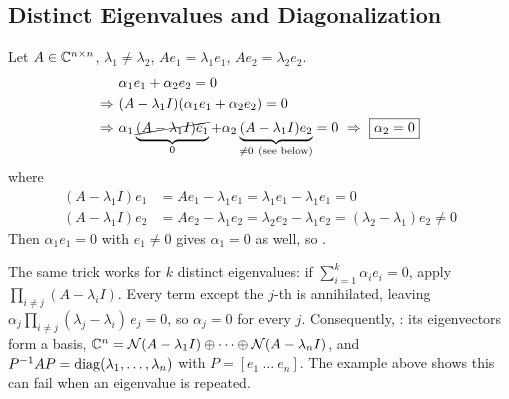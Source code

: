 \subsection{Distinct Eigenvalues and Diagonalization}\label{ss:diagonalization}
Let $A\in\mathbb{C}^{n\times n}$, $\lambda_1\neq\lambda_2$, $Ae_1=\lambda_1e_1$, $Ae_2=\lambda_2e_2$.
\begin{align*}
&\alpha_1e_1+\alpha_2e_2=0\\
\Rightarrow\ &(A-\lambda_1I)(\alpha_1e_1+\alpha_2e_2)=0\\
\Rightarrow\ &\alpha_1\underbrace{\cancel{(A-\lambda_1I)e_1}}_{0}+\alpha_2\underbrace{(A-\lambda_1I)e_2}_{\neq0\ \text{(see below)}}=0\ \Rightarrow\ \boxed{\alpha_2=0}
\end{align*}
where
\begin{align*}
(A-\lambda_1I)e_1&=Ae_1-\lambda_1e_1=\lambda_1e_1-\lambda_1e_1=0\\
(A-\lambda_1I)e_2&=Ae_2-\lambda_1e_2=\lambda_2e_2-\lambda_1e_2=(\lambda_2-\lambda_1)e_2\neq0
\end{align*}
Then $\alpha_1e_1=0$ with $e_1\neq0$ gives $\alpha_1=0$ as well, so .

\begin{insight}
The same trick works for $k$ distinct eigenvalues: if $\sum_{i=1}^k\alpha_ie_i=0$, apply $\prod_{i\neq j}(A-\lambda_iI)$. Every term except the $j$-th is annihilated, leaving $\alpha_j\prod_{i\neq j}(\lambda_j-\lambda_i)\,e_j=0$, so $\alpha_j=0$ for every $j$. Consequently, : its eigenvectors form a basis, $\mathbb{C}^n=\mathcal{N}(A-\lambda_1I)\oplus\dots\oplus\mathcal{N}(A-\lambda_nI)$, and $P^{-1}AP=\operatorname{diag}(\lambda_1,\dots,\lambda_n)$ with $P=[e_1\ \dots\ e_n]$. The example above shows this can fail when an eigenvalue is repeated.
\end{insight}

